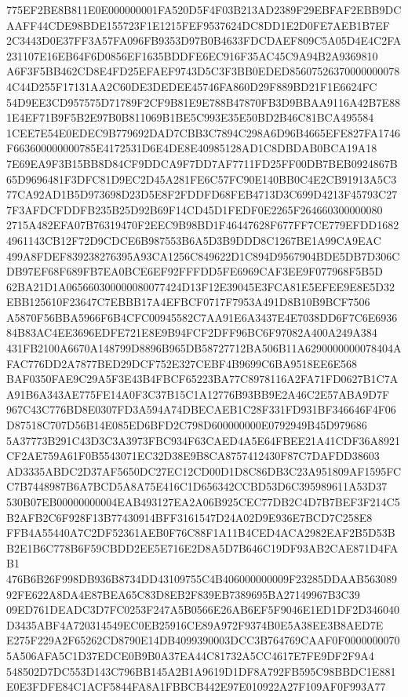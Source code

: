 \documentclass[UTF8,fontset=fandol,zihao=-4,a4paper]{ctexart}
\begin{document}
{{775EF2BE8B811E0E000000001FA520D5F4F03B213AD2389F29EBFAF2EBB9DCAAFF44CDE98BDE155723F1E1215FEF9537624DC8DD1E2D0FE7AEB1B7EF
2C3443D0E37FF3A57FA096FB9353D97B0B4633FDCDAEF809C5A05D4E4C2FA231107E16EB64F6D0856EF1635BDDFE6EC916F35AC45C9A94B2A9369810
A6F3F5BB462CD8E4FD25EFAEF9743D5C3F3BB0EDED856075263700000000784C44D255F17131AA2C60DE3DEDEE45746FA860D29F889BD21F1E6624FC
54D9EE3CD957575D71789F2CF9B81E9E788B47870FB3D9BBAA9116A42B7E881E4EF71B9F5B2E97B0B811069B1BE5C993E35E50BD2B46C81BCA495584
1CEE7E54E0EDEC9B779692DAD7CBB3C7894C298A6D96B4665EFE827FA1746F663600000000785E4172531D6E4DE8E40985128AD1C8DBDAB0BCA19A18
7E69EA9F3B15BB8D84CF9DDCA9F7DD7AF7711FD25FF00DB7BEB0924867B65D9696481F3DFC81D9EC2D45A281FE6C57FC90E140BB0C4E2CB91913A5C3
77CA92AD1B5D973698D23D5E8F2FDDFD68FEB4713D3C699D4213F45793C277F3AFDCFDDFB235B25D92B69F14CD45D1FEDF0E2265F264660300000080
2715A482EFA07B76319470F2EEC9B98BD1F46447628F677FF7CE779EFDD16824961143CB12F72D9CDCE6B987553B6A5D3B9DDD8C1267BE1A99CA9EAC
499A8FDEF839238276395A93CA1256C849622D1C894D9567904BDE5DB7D306CDB97EF68F689FB7EA0BCE6EF92FFFDD5FE6969CAF3EE9F077968F5B5D
62BA21D1A065660300000080077424D13F12E39045E3FCA81E5EFEE9E8E5D32EBB125610F23647C7EBBB17A4EFBCF0717F7953A491D8B10B9BCF7506
A5870F56BBA5966F6B4CFC00945582C7AA91E6A3437E4E7038DD6F7C6E693684B83AC4EE3696EDFE721E8E9B94FCF2DFF96BC6F97082A400A249A384
431FB2100A6670A148799D8896B965DB58727712BA506B11A6290000000078404AFAC776DD2A7877BED29DCF752E327CEBF4B9699C6BA9518EE6E568
BAF0350FAE9C29A5F3E43B4FBCF65223BA77C8978116A2FA71FD0627B1C7AA91B6A343AE775FE14A0F3C37B15C1A12776B93BB9E2A46C2E57ABA9D7F
967C43C776BD8E0307FD3A594A74DBECAEB1C28F331FD931BF346646F4F06D87518C707D56B14E085ED6BFD2C798D600000000E0792949B45D979686
5A37773B291C43D3C3A3973FBC934F63CAED4A5E64FBEE21A41CDF36A8921CF2AE759A61F0B5543071EC32D38E9B8CA8757412430F87C7DAFDD38603
AD3335ABDC2D37AF5650DC27EC12CD00D1D8C86DB3C23A951809AF1595FCC7B7448987B6A7BCD5A8A75E416C1D656342CCBD53D6C395989611A53D37
530B07EB00000000004EAB493127EA2A06B925CEC77DB2C4D7B7BEF3F214C5B2AFB2C6F928F13B77430914BFF3161547D24A02D9E936E7BCD7C258E8
FFB4A55440A7C2DF52361AEB0F76C88F1A11B4CED4ACA2982EAF2B5D53BB2E1B6C778B6F59CBDD2EE5E716E2D8A5D7B646C19DF93AB2CAE871D4FAB1
476B6B26F998DB936B8734DD43109755C4B406000000009F23285DDAAB56308992FE622A8DA4E87BEA65C83D8EB2F839EB7389695BA27149967B3C39
09ED761DEADC3D7FC0253F247A5B0566E26AB6EF5F9046E1ED1DF2D346040D3435ABF4A720314549EC0EB25916CE89A972F9374B0E5A38EE3B8AED7E
E275F229A2F65262CD8790E14DB4099390003DCC3B764769CAAF0F00000000705A506AFA5C1D37EDCE0B9B0A37EA44C81732A5CC4617E7FE9DF2F9A4
548502D7DC553D143C796BB145A2B1A9619D1DF8A792FB595C98BBDC1E881E0E3FDFE84C1ACF5844FA8A1FBBCB442E97E010922A27F109AF0F993A77
}}
\end{document}
